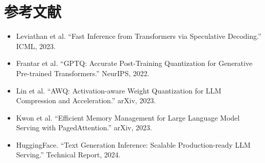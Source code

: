 \documentclass[UTF8,zihao=-4]{ctexart}
\begin{document}
\section*{参考文献}
\begin{itemize}
  \item Leviathan et al. ``Fast Inference from Transformers via Speculative Decoding.'' ICML, 2023.
  \item Frantar et al. ``GPTQ: Accurate Post-Training Quantization for Generative Pre-trained Transformers.'' NeurIPS, 2022.
  \item Lin et al. ``AWQ: Activation-aware Weight Quantization for LLM Compression and Acceleration.'' arXiv, 2023.
  \item Kwon et al. ``Efficient Memory Management for Large Language Model Serving with PagedAttention.'' arXiv, 2023.
  \item HuggingFace. ``Text Generation Inference: Scalable Production-ready LLM Serving.'' Technical Report, 2024.
\end{itemize}
\end{document}
